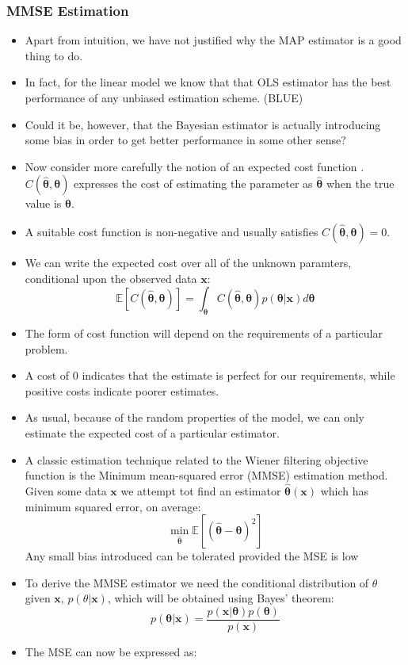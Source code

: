 \documentclass[12pt]{article}
\newcommand{\mexp}{\mathbb{E}}
\newcommand{\thetab}{\boldsymbol{\theta}}
\newcommand{\prethe}{\hat{\thetab}}
\newcommand{\xb}{\mathbf{x}}
\begin{document}
\subsubsection{MMSE Estimation}
\begin{itemize}
    \item Apart from intuition, we have not justified why the MAP estimator is a good thing to do.
    \item In fact, for the linear model we know that that OLS estimator has the best performance of any unbiased estimation scheme. (BLUE)
    \item Could it be, however, that the Bayesian estimator is actually introducing some bias in order to get better performance in some other sense?
    \item Now consider more carefully the notion of an expected cost function . $C(\prethe, \thetab)$ expresses the cost of estimating the parameter as $\prethe$ when the true value is $\thetab$.
    \item A suitable cost function is non-negative and usually satisfies $C(\prethe, \thetab) = 0$.
    \item We can write the expected cost over all of the unknown paramters, conditional upon the observed data $\xb$:
    \[
    \mexp[C(\prethe, \thetab)] = \int_{\thetab} C(\prethe, \thetab) p(\thetab | \xb) d\thetab
    \]
    \item The form of cost function will depend on the requirements of a particular problem.
    \item A cost of 0 indicates that the estimate is perfect for our requirements, while positive costs indicate poorer estimates.
    \item As usual, because of the random properties of the model, we can only estimate the expected cost of a particular estimator.
    \item A classic estimation technique related to the Wiener filtering objective function is the Minimum mean-squared error (MMSE) estimation method. Given some data $\xb$ we attempt tot find an estimator $\prethe(\xb)$ which has minimum squared error, on average:
    \[
    \min_{\prethe} \mexp[(\prethe - \thetab)^2]
    \]
    Any small bias introduced can be tolerated provided the MSE is low
    \item To derive the MMSE estimator we need the conditional distribution of $\theta$ given $\xb$, $p(\theta | \xb)$, which will be obtained using Bayes' theorem:
    \[
    p(\thetab | \xb) = \frac{p(\xb | \thetab)p(\thetab)}{p(\xb)}
    \]
    \item The MSE can now be expressed as:

\end{itemize}
\end{document}
